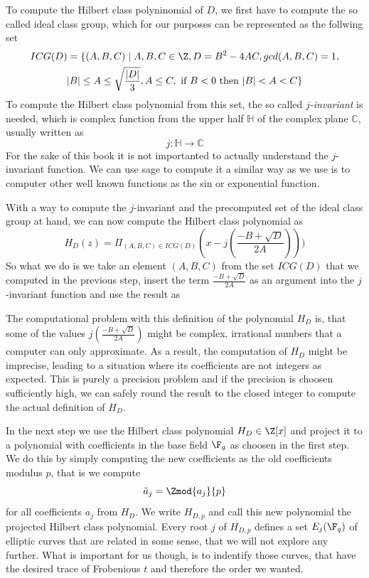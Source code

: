 To compute the Hilbert class polyninomial of $D$, we first have to compute the so called ideal class group, which for our purposes can be represented as the  follwing set
\begin{multline*}
ICG(D)=\{(A,B,C)\;|\; A,B,C\in\Z, D = B^2-4AC, gcd(A,B,C)=1, \\
|B|\leq A \leq \sqrt{\frac{|D|}{3}}, A\leq C, 
\text{ if } B< 0 \text{ then } |B| < A < C\}
\end{multline*} 
To compute the Hilbert class polynomial from this set, the so called \textit{$j$-invariant} is needed, which is complex function from the upper half $\mathbb{H}$ of the complex plane $\mathbb{C}$, usually written as
\begin{equation}
j: \mathbb{H} \to \mathbb{C}
\end{equation}
For the sake of this book it is not importanted to actually understand the $j$-invariant function. We can use sage to compute it a similar way as we use is to computer other well known functions as the sin or exponential function. 

With a way to compute the $j$-invariant and the precomputed set of the ideal class group at hand, we can now compute the Hilbert class polynomial as
\begin{equation}
H_D(z) = \Pi_{(A,B,C)\in ICG(D)} \left(x - j\left(\frac{-B + \sqrt{D}}{2A}\right)\right))
\end{equation}
So what we do is we take an element $(A,B,C)$ from the set $ICG(D)$ that we computed in the previous step, insert the term $\frac{-B + \sqrt{D}}{2A}$ as an argument into the $j$-invariant function and use the result as 

The computational problem with this definition of the polynomial $H_D$ is, that some of the values $j(\frac{-B + \sqrt{D}}{2A})$ might be complex, irrational numbers that a computer can only approximate. As a result, the computation of $H_D$ might be imprecise, leading to a situation where its coefficients are not integers as expected. This is purely a precision problem and if the precision is choosen sufficiently high, we can safely round the result to the closed integer to compute the actual definition of $H_D$.

In the next step we use the Hilbert class polynomial $H_D\in \Z[x]$ and project it to a polynomial with coefficients in the base field $\F_q$ as choosen in the first step. We do this by simply computing the new coefficients as the old coefficients modulus $p$, that is we compute
\begin{equation}
\tilde{a}_j = \Zmod{a_j}{p}
\end{equation}
for all coefficients $a_j$ from $H_D$. We write $H_{D,p}$ and call this new polynomial  the projected Hilbert class polynomial. Every root $j$ of $H_{D,p}$ defines a set $E_j(\F_q)$ of elliptic curves that are related in some sense, that we will not explore any further. What is important for us though, is to indentify those curves, that have the desired trace of Frobenious $t$ and therefore the order we wanted.


